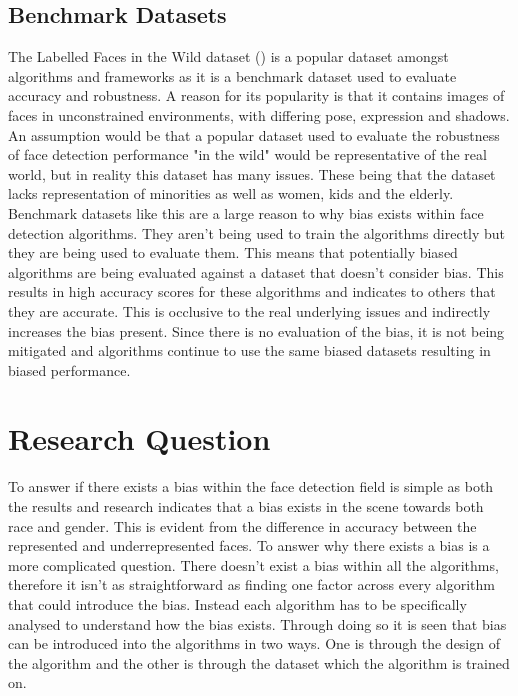 \documentclass{l4proj}
\begin{document}
\subsection{Benchmark Datasets}
The Labelled Faces in the Wild dataset (\cite{300w}) is a popular dataset amongst algorithms and frameworks as it is a benchmark dataset used to evaluate accuracy and robustness. A reason for its popularity is that it contains images of faces in unconstrained environments, with differing pose, expression and shadows. An assumption would be that a popular dataset used to evaluate the robustness of face detection performance "in the wild" would be representative of the real world, but in reality this dataset has many issues. These being that the dataset lacks representation of minorities as well as women, kids and the elderly. Benchmark datasets like this are a large reason to why bias exists within face detection algorithms. They aren't being used to train the algorithms directly but they are being used to evaluate them. This means that potentially biased algorithms are being evaluated against a dataset that doesn't consider bias. This results in high accuracy scores for these algorithms and indicates to others that they are accurate. This is occlusive to the real underlying issues and indirectly increases the bias present. Since there is no evaluation of the bias, it is not being mitigated and algorithms continue to use the same biased datasets resulting in biased performance. 
\section{Research Question}
To answer if there exists a bias within the face detection field is simple as both the results and research indicates that a bias exists in the scene towards both race and gender. This is evident from the difference in accuracy between the represented and underrepresented faces. To answer why there exists a bias is a more complicated question. There doesn't exist a bias within all the algorithms, therefore it isn't as straightforward as finding one factor across every algorithm that could introduce the bias. Instead each algorithm has to be specifically analysed to understand how the bias exists. Through doing so it is seen that bias can be introduced into the algorithms in two ways. One is through the design of the algorithm and the other is through the dataset which the algorithm is trained on. 
\end{document}

